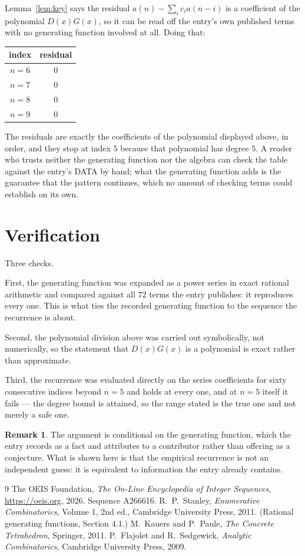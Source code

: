\documentclass[11pt,a4paper]{article}
\theoremstyle{plain}
\theoremstyle{definition}
\newtheorem{remark}[theorem]{Remark}
\begin{document}
Lemma~\ref{lem:key} says the residual $a(n)-\sum_ic_ia(n-i)$ is a coefficient of the
polynomial $D(x)G(x)$, so it can be read off the entry's own published terms with no
generating function involved at all. Doing that:
\begin{center}
\begin{tabular}{cc}
index & residual \\ \hline
$n=6$ & $0$ \\
$n=7$ & $0$ \\
$n=8$ & $0$ \\
$n=9$ & $0$
\end{tabular}
\end{center}
The residuals are exactly the coefficients of the polynomial displayed above, in order, and
they stop at index $5$ because that polynomial has degree $5$. A reader who trusts
neither the generating function nor the algebra can check the table against the entry's DATA
by hand; what the generating function adds is the guarantee that the pattern continues, which
no amount of checking terms could establish on its own.

\section{Verification}

Three checks.

First, the generating function was expanded as a power series in exact rational arithmetic and
compared against all $72$ terms the entry publishes: it reproduces every one. This is
what ties the recorded generating function to the sequence the recurrence is about.

Second, the polynomial division above was carried out symbolically, not numerically, so the
statement that $D(x)G(x)$ is a polynomial is exact rather than approximate.

Third, the recurrence was evaluated directly on the series coefficients for sixty consecutive
indices beyond $n=5$ and holds at every one, and at $n=5$ itself it fails --- the
degree bound is attained, so the range stated is the true one and not merely a safe one.

\begin{remark}
The argument is conditional on the generating function, which the entry records as a fact and
attributes to a contributor rather than offering as a conjecture. What is shown here is that
the empirical recurrence is not an independent guess: it is equivalent to information the
entry already contains.
\end{remark}

\begin{thebibliography}{9}
 The OEIS Foundation, \emph{The On-Line Encyclopedia of Integer
Sequences}, \url{https://oeis.org}, 2026. Sequence A266616.
 R.~P.~Stanley, \emph{Enumerative Combinatorics}, Volume 1, 2nd ed.,
Cambridge University Press, 2011. (Rational generating functions, Section 4.1.)
 M.~Kauers and P.~Paule, \emph{The Concrete Tetrahedron}, Springer, 2011.
 P.~Flajolet and R.~Sedgewick, \emph{Analytic Combinatorics}, Cambridge
University Press, 2009.
\end{thebibliography}
\end{document}
